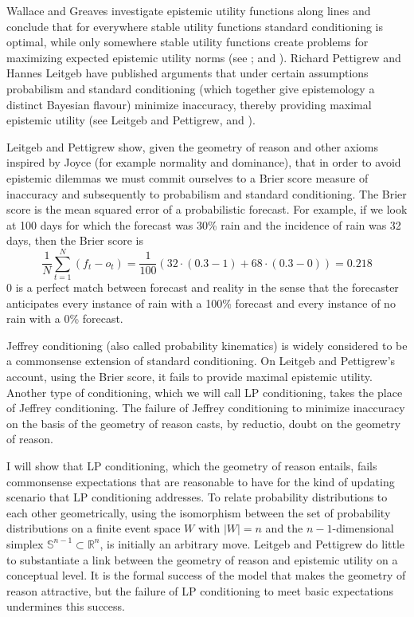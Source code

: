 \documentclass[phd,12pt,oneside]{ubcthesis}
\begin{document}
Wallace and Greaves investigate epistemic utility functions along
 lines and conclude that for everywhere stable
utility functions standard conditioning is optimal, while only
somewhere stable utility functions create problems for maximizing
expected epistemic utility norms (see ;
and ). Richard Pettigrew and Hannes Leitgeb
have published arguments that under certain assumptions probabilism
and standard conditioning (which together give epistemology a distinct
Bayesian flavour) minimize inaccuracy, thereby providing maximal
epistemic utility (see Leitgeb and Pettigrew,
 and
).

Leitgeb and Pettigrew show, given the geometry of reason and other
axioms inspired by Joyce (for example normality and dominance), that
in order to avoid epistemic dilemmas we must commit ourselves to a
Brier score measure of inaccuracy and subsequently to probabilism and
standard conditioning. The Brier score is the mean squared error of a
probabilistic forecast. For example, if we look at 100 days for which
the forecast was 30\% rain and the incidence of rain was 32 days, then
the Brier score is
\begin{equation}
  \label{eq:thahthoo}
  \frac{1}{N}\sum_{t=1}^{N}\left(f_{t}-o_{t}\right)=\frac{1}{100}\left(32\cdot{}(0.3-1)+68\cdot{}(0.3-0)\right)=0.218
\end{equation}
$0$ is a perfect match between forecast and reality in the sense that
the forecaster anticipates every instance of rain with a 100\%
forecast and every instance of no rain with a 0\% forecast.

Jeffrey conditioning (also called probability kinematics) is widely
considered to be a commonsense extension of standard conditioning. On
Leitgeb and Pettigrew's account, using the Brier score, it fails to
provide maximal epistemic utility. Another type of conditioning, which
we will call LP conditioning, takes the place of Jeffrey conditioning.
The failure of Jeffrey conditioning to minimize inaccuracy on the
basis of the geometry of reason casts, by reductio, doubt on the
geometry of reason.

I will show that LP conditioning, which the geometry of reason
entails, fails commonsense expectations that are reasonable to have
for the kind of updating scenario that LP conditioning addresses. To
relate probability distributions to each other geometrically, using
the isomorphism between the set of probability distributions on a
finite event space $W$ with $|W|=n$ and the $n-1$-dimensional simplex
$\mathbb{S}^{n-1}\subset\mathbb{R}^{n}$, is initially an arbitrary
move. Leitgeb and Pettigrew do little to substantiate a link between
the geometry of reason and epistemic utility on a conceptual level. It
is the formal success of the model that makes the geometry of reason
attractive, but the failure of LP conditioning to meet basic
expectations undermines this success.
\end{document}
